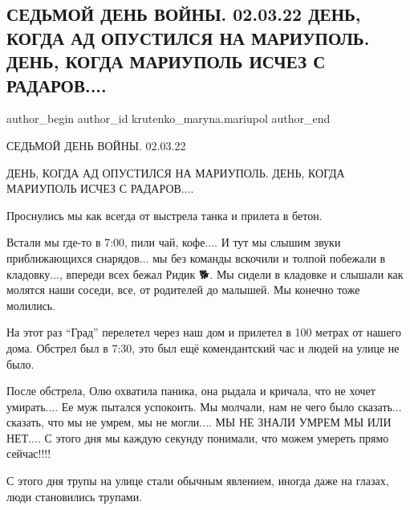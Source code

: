  
 
 
 
 

\subsection{СЕДЬМОЙ ДЕНЬ ВОЙНЫ. 02.03.22 ДЕНЬ, КОГДА АД ОПУСТИЛСЯ НА МАРИУПОЛЬ. ДЕНЬ, КОГДА МАРИУПОЛЬ ИСЧЕЗ С РАДАРОВ....}
\label{sec:02_03_2023.fb.krutenko_maryna.mariupol.1.sedmoi_den_voini__02}

\ifcmt
 author_begin
   author_id krutenko_maryna.mariupol
 author_end
\fi

СЕДЬМОЙ ДЕНЬ ВОЙНЫ. 02.03.22

ДЕНЬ, КОГДА АД ОПУСТИЛСЯ НА МАРИУПОЛЬ. ДЕНЬ, КОГДА МАРИУПОЛЬ ИСЧЕЗ С РАДАРОВ....

Проснулись мы как всегда от выстрела танка и прилета в бетон. 

Встали мы где-то в 7:00, пили чай, кофе.... И тут мы слышим звуки приближающихся
снарядов... мы без команды вскочили и толпой побежали в кладовку..., впереди всех
бежал Ридик 🐕. Мы сидели в кладовке и слышали как молятся наши соседи, все, от
родителей до малышей. Мы конечно тоже молились. 

На этот раз \enquote{Град} перелетел через наш дом и прилетел в 100 метрах от нашего
дома. Обстрел был в 7:30, это был ещё комендантский час и людей на улице не
было. 

После обстрела, Олю охватила паника, она рыдала и кричала, что не хочет
умирать.... Ее муж пытался успокоить. Мы молчали, нам не чего было сказать...
сказать, что мы не умрем, мы не могли.... МЫ НЕ ЗНАЛИ УМРЕМ МЫ ИЛИ НЕТ.... С этого
дня мы каждую секунду понимали, что можем умереть прямо сейчас!!!! 

С этого дня трупы на улице стали обычным явлением, иногда даже на глазах, люди
становились трупами. 

